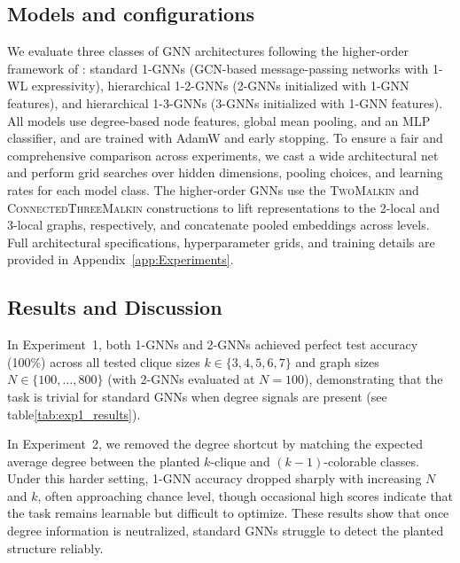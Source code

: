 \subsection{Models and configurations}\label{sec:ModelsandConfig}
We evaluate three classes of GNN architectures following the higher-order framework of \citet{MorrisEtAl2019}: standard 1-GNNs (GCN-based message-passing networks with 1-WL expressivity), hierarchical 1-2-GNNs (2-GNNs initialized with 1-GNN features), and hierarchical 1-3-GNNs (3-GNNs initialized with 1-GNN features). All models use degree-based node features, global mean pooling, and an MLP classifier, and are trained with AdamW and early stopping. To ensure a fair and comprehensive comparison across experiments, we cast a wide architectural net and perform grid searches over hidden dimensions, pooling choices, and learning rates for each model class. The higher-order GNNs use the \textsc{TwoMalkin} and \textsc{ConnectedThreeMalkin} constructions to lift representations to the 2-local and 3-local graphs, respectively, and concatenate pooled embeddings across levels. Full architectural specifications, hyperparameter grids, and training details are provided in Appendix~\ref{app:Experiments}.



\subsection{Results and Discussion}\label{subsec:ResultsandDiscussion}
In Experiment~1, 
both 1-GNNs and 2-GNNs achieved perfect test accuracy (100\%) across all tested clique sizes $k \in \{3,4,5,6,7\}$ and graph sizes $N \in \{100,\dots,800\}$ (with 2-GNNs evaluated at $N=100$), demonstrating that the task is trivial for standard GNNs when degree signals are present (see table\ref{tab:exp1_results}).

In Experiment~2, we removed the degree shortcut by matching the expected average degree between the planted $k$-clique and $(k\!-\!1)$-colorable classes. Under this harder setting, 1-GNN accuracy dropped sharply with increasing $N$ and $k$, often approaching chance level, though occasional high scores indicate that the task remains learnable but difficult to optimize. These results show that once degree information is neutralized, standard GNNs struggle to detect the planted structure reliably.

